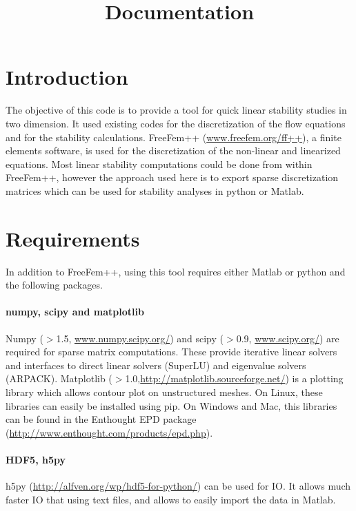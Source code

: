 \documentclass[12pts]{article}%
\begin{document}
\title{Documentation}

\maketitle

\section{Introduction}

The objective of this code is to provide a tool for quick linear
stability studies in two dimension. It used existing codes for the
discretization of the flow equations and for the stability
calculations. FreeFem++ (\url{www.freefem.org/ff++}), a finite
elements software, is used for the discretization of the non-linear
and linearized equations. Most linear stability computations could be
done from within FreeFem++, however the approach used here is to
export sparse discretization matrices which can be used for stability
analyses in python or Matlab.


\section{Requirements}

In addition to FreeFem++, using this tool requires either Matlab or
python and the following packages. 

\paragraph{numpy, scipy and matplotlib} Numpy ($>$1.5,
\url{www.numpy.scipy.org/}) and scipy ($>$0.9, \url{www.scipy.org/})
are required for sparse matrix computations. These provide iterative
linear solvers and interfaces to direct linear solvers (SuperLU) and
eigenvalue solvers (ARPACK). Matplotlib
($>$1.0,\url{http://matplotlib.sourceforge.net/}) is a plotting
library which allows contour plot on unstructured meshes. On Linux,
these libraries can easily be installed using pip. On Windows and Mac,
this libraries can be found in the Enthought EPD package
(\url{http://www.enthought.com/products/epd.php}).

\paragraph{HDF5, h5py} h5py
(\url{http://alfven.org/wp/hdf5-for-python/}) can be used for IO. It
allows much faster IO that using text files, and allows to easily
import the data in Matlab.
\end{document}

